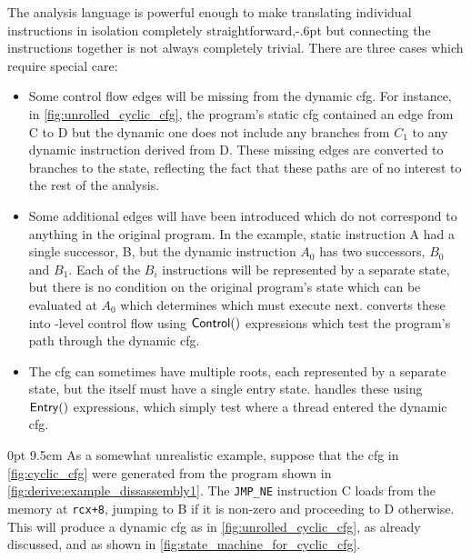 The {\StateMachine} analysis language is powerful enough to make
translating individual instructions in isolation completely
straightforward,\kern-.6pt but connecting the instructions together is not
always completely trivial.  There are three cases which require
special care:
\begin{itemize}
\item
  Some control flow edges will be missing from the \gls{dynamic cfg}.
  For instance, in \autoref{fig:unrolled_cyclic_cfg}, the program's
  \gls{static cfg} contained an edge from C to D but the dynamic one
  does not include any branches from $C_1$ to any dynamic instruction
  derived from D.  These missing edges are converted to branches to
  the {\stUnreached} state, reflecting the fact that these paths are
  of no interest to the rest of the analysis.
\item
  Some additional edges will have been introduced which do not
  correspond to anything in the original program.  In the example,
  static instruction A had a single successor, B, but the dynamic
  instruction $A_0$ has two successors, $B_0$ and $B_1$.  Each of the
  $B_i$ instructions will be represented by a separate {\StateMachine}
  state, but there is no condition on the original program's state
  which can be evaluated at $A_0$ which determines which must execute
  next.  {\Technique} converts these into {\StateMachine}-level
  control flow using ${\mathsf{Control}}()$ expressions which test the
  program's path through the \gls{dynamic cfg}.
\item
  The \gls{cfg} can sometimes have multiple roots, each represented by
  a separate {\StateMachine} state, but the {\StateMachine} itself
  must have a single entry state.  {\Technique} handles these using
  $\mathsf{Entry}()$ expressions, which simply test where a thread entered
  the \gls{dynamic cfg}.
\end{itemize}

  0pt 9.5cm
\noindent As a somewhat unrealistic example, suppose that the
\gls{cfg} in \autoref{fig:cyclic_cfg} were generated from the program
shown in \autoref{fig:derive:example_dissassembly1}.  The
\texttt{JMP\_NE} instruction C loads from the memory at
\texttt{rcx+8}, jumping to B if it is non-zero and proceeding to D
otherwise.  This will produce a \gls{dynamic cfg} as in
\autoref{fig:unrolled_cyclic_cfg}, as already discussed, and
\AStateMachine{} as shown in
\autoref{fig:state_machine_for_cyclic_cfg}.

